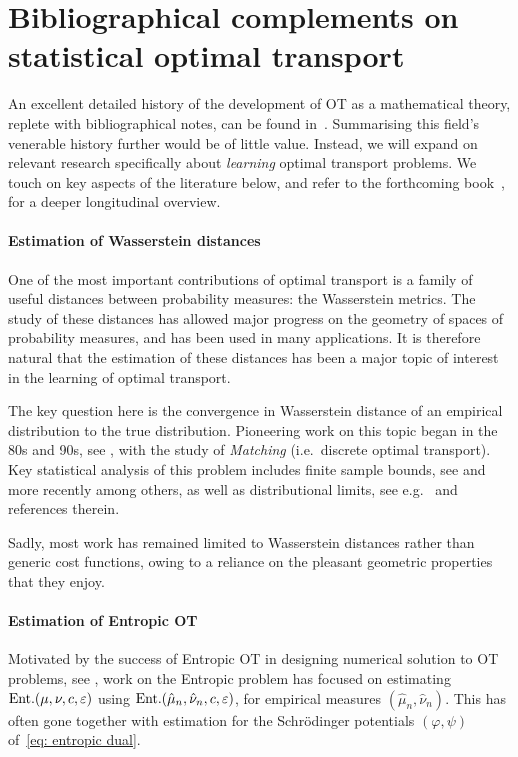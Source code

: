 \section{Bibliographical complements on statistical optimal transport}\label{app: biblio}

    An excellent detailed history of the development of OT as a mathematical theory, replete with bibliographical notes, can be found in~\cite[Ch.~3]{villani_topics_2003}. Summarising this field's venerable history further would be of little value. Instead, we will expand on relevant research specifically about \textit{learning} optimal transport problems. We touch on key aspects of the literature below, and refer to the forthcoming book~\cite{chewi_statistical_2024}, for a deeper longitudinal overview.
  
        \paragraph{Estimation of Wasserstein distances}
            One of the most important contributions of optimal transport is a family of useful distances between probability measures: the Wasserstein metrics. The study of these distances has allowed major progress on the geometry of spaces of probability measures, and has been used in many applications. It is therefore natural that the estimation of these distances has been a major topic of interest in the learning of optimal transport. 

            The key question here is the convergence in Wasserstein distance of an empirical distribution to the true distribution. Pioneering work on this topic began in the 80s and 90s, see \citep{ajtai_optimal_1984,talagrand_transportation_1994}, with the study of \emph{Matching} (i.e.\ discrete optimal transport). Key statistical analysis of this problem includes finite sample bounds, see \citep{horowitz_mean_1994} and more recently \citep{fournier_rate_2015,weed_sharp_2019} among others, as well as distributional limits, see e.g.\
            \citep{tameling_empirical_2019} and references therein. 

            Sadly, most work has remained limited to Wasserstein distances rather than generic cost functions, owing to a reliance on the pleasant geometric properties that they enjoy.

        \paragraph{Estimation of Entropic OT}
            Motivated by the success of Entropic OT in designing numerical solution to OT problems, see \citep{cuturi_sinkhorn_2013}, work on the Entropic problem has focused on estimating $\text{Ent.}(\mu,\nu,c,\varepsilon)$ using $\text{Ent.}(\hat\mu_n,\hat\nu_n,c,\varepsilon)$, for empirical measures $(\hat\mu_n,\hat\nu_n)$. This has often gone together with estimation for the Schrödinger potentials $(\varphi,\psi)$ of~\eqref{eq: entropic dual}.

